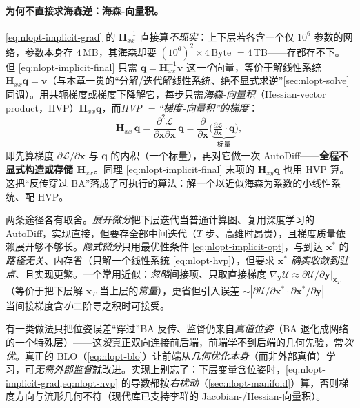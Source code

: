\paragraph{为何不直接求海森逆：海森-向量积。}\cite{carlone2026handbook}
\cref{eq:nlopt-implicit-grad} 的 $\mathbf{H}_{xx}^{-1}$ 直接算\emph{不现实}：上下层若各含一个仅 $10^6$ 参数的网络，参数本身存 $4$\,MB，其海森却要 $(10^6)^2\times4$\,Byte $=4$\,TB——存都存不下。但 \cref{eq:nlopt-implicit-final} 只需 $\mathbf{q}=\mathbf{H}_{xx}^{-1}\mathbf{v}$ 这\emph{一个}向量，等价于解线性系统 $\mathbf{H}_{xx}\mathbf{q}=\mathbf{v}$（与本章一贯的“分解/迭代解线性系统、绝不显式求逆”\cref{sec:nlopt-solve} 同调）。用共轭梯度或梯度下降解它，每步只需\emph{海森-向量积}（Hessian-vector product，HVP）$\mathbf{H}_{xx}\mathbf{q}$，而\emph{HVP $=$“梯度-向量积”的梯度}：
\begin{equation}
  \mathbf{H}_{xx}\,\mathbf{q}=\frac{\partial^2\mathcal{L}}{\partial\mathbf{x}\partial\mathbf{x}}\,\mathbf{q}
  =\frac{\partial}{\partial\mathbf{x}}\Big(\underbrace{\tfrac{\partial\mathcal{L}}{\partial\mathbf{x}}\cdot\mathbf{q}}_{\text{标量}}\Big),
  \label{eq:nlopt-hvp}
\end{equation}
即先算梯度 $\partial\mathcal{L}/\partial\mathbf{x}$ 与 $\mathbf{q}$ 的内积（一个标量），再对它做一次 AutoDiff——\textbf{全程不显式构造或存储 $\mathbf{H}_{xx}$}。同理 \cref{eq:nlopt-implicit-final} 末项的 $\mathbf{H}_{xy}\mathbf{q}$ 也用 HVP 算。这把“反传穿过 BA”落成了可执行的算法：解一个以近似海森为系数的小线性系统、配 HVP。

\begin{insight}[展开 vs 隐式：存计算图还是解线性系统]
两条途径各有取舍。\emph{展开微分}把下层迭代当普通计算图、复用深度学习的 AutoDiff，实现直接，但要存全部中间迭代（$T$ 步、高维时昂贵），且梯度质量依赖展开够不够长。\emph{隐式微分}只用最优性条件 \cref{eq:nlopt-implicit-opt}，与到达 $\mathbf{x}^*$ 的\emph{路径无关}、内存省（只解一个线性系统 \cref{eq:nlopt-hvp}），但要求 $\mathbf{x}^*$ \emph{确实收敛到驻点}、且实现更繁。一个常用近似：\emph{忽略}间接项、只取直接梯度 $\nabla_{\mathbf{y}}\mathcal{U}\approx\partial\mathcal{U}/\partial\mathbf{y}|_{\mathbf{x}_T}$（等价于把下层解 $\mathbf{x}_T$ 当上层的\emph{常量}），更省但引入误差 $\sim|\partial\mathcal{U}/\partial\mathbf{x}^*\cdot\partial\mathbf{x}^*/\partial\mathbf{y}|$——当间接梯度含\emph{小}二阶导之积时可接受。
\end{insight}

\begin{pitfall}
有一类做法只把位姿误差“穿过”BA 反传、监督仍来自\emph{真值位姿}（BA 退化成网络的一个特殊层）——这\emph{没}真正双向连接前后端，前端学不到后端的几何先验，常\emph{次优}。真正的 BLO（\cref{eq:nlopt-blo}）让前端从\emph{几何优化本身}（而非外部真值）学习，可\emph{无需外部监督}就改进。实现上别忘了：下层变量含位姿时，\cref{eq:nlopt-implicit-grad,eq:nlopt-hvp} 的导数都按\emph{右扰动}（\cref{sec:nlopt-manifold}）算，否则梯度方向与流形几何不符（现代库已支持李群的 Jacobian-/Hessian-向量积）。
\end{pitfall}

